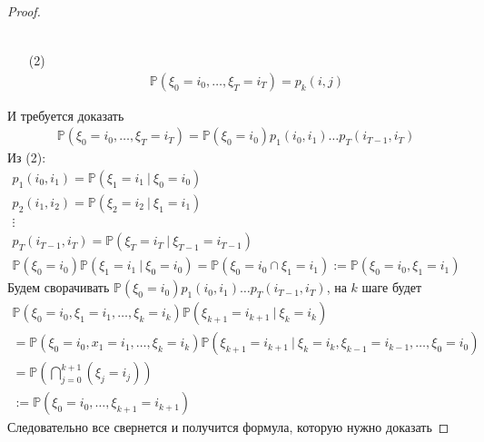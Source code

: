 \begin{proof}
\begin{enumerate}
\begin{gather*}
            \end{gather*}
        \item[(2)]
            \begin{gather*}
                \mathbb{P}(\xi_0 = i_0, \ldots, \xi_T = i_T)
                = p_k(i,j)
            \end{gather*}
        \end{enumerate}
        И требуется доказать
        \begin{gather*}
            \mathbb{P}(\xi_0 = i_0, \ldots, \xi_T = i_T)
            = \mathbb{P}(\xi_0 = i_0) p_1(i_0, i_1) \ldots p_T(i_{T-1}, i_T)
        \end{gather*}
        Из (2):
        \begin{gather*}
            p_1(i_0, i_1) = \mathbb{P}(\xi_1 = i_1\ |\ \xi_0 = i_0)\\
            p_2(i_1, i_2) = \mathbb{P}(\xi_2 = i_2\ |\ \xi_1 = i_1)\\
            \vdots\\
            p_T(i_{T-1}, i_{T}) = \mathbb{P}(\xi_T = i_T\ |\ \xi_{T-1} = i_{T-1})\\
            \mathbb{P}(\xi_0 = i_0) \mathbb{P}(\xi_1 = i_1\ |\ \xi_0 = i_0)
            = \mathbb{P}(\xi_0 = i_0 \cap \xi_1 = i_1)
            := \mathbb{P}(\xi_0 = i_0, \xi_1 = i_1)
        \end{gather*}
        Будем сворачивать $\mathbb{P}(\xi_0 = i_0) p_1(i_0, i_1) \ldots p_T(i_{T-1}, i_T)$, на $k$ шаге будет
        \begin{gather*}
            \mathbb{P}(\xi_0 = i_0, \xi_1 = i_1, \ldots, \xi_k = i_k)
            \mathbb{P}(\xi_{k+1} = i_{k+1}\ |\ \xi_k = i_k)\\
            = \mathbb{P}(\xi_0 = i_0, x_1 = i_1, \ldots, \xi_k = i_k)
            \mathbb{P}(\xi_{k+1} = i_{k+1}\ |\ \xi_{k} = i_{k}, \xi_{k-1} = i_{k-1}, \ldots, \xi_0 = i_0)\\
            = \mathbb{P}(\bigcap \limits_{j=0}^{k+1} (\xi_j = i_j))\\
            := \mathbb{P}(\xi_0 = i_0, \ldots, \xi_{k+1} = i_{k+1})
        \end{gather*}
        Следовательно все свернется и получится формула, которую нужно доказать
    \end{proof}
\vskip 0.6in


